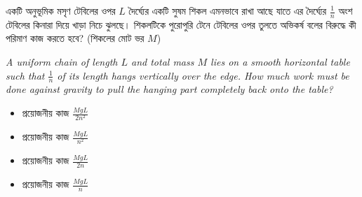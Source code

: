 \documentclass[12pt, a4paper]{article}
\begin{document}
\newpage

\begin{tcolorbox}[questionbox={প্রশ্ন (Question) 8}]
    \noindent
    একটি অনুভূমিক মসৃণ টেবিলের ওপর $L$ দৈর্ঘ্যের একটি সুষম শিকল এমনভাবে রাখা আছে যাতে এর দৈর্ঘ্যের $\frac{1}{n}$ অংশ টেবিলের কিনারা দিয়ে খাড়া নিচে ঝুলছে। শিকলটিকে পুরোপুরি টেনে টেবিলের ওপর তুলতে অভিকর্ষ বলের বিরুদ্ধে কী পরিমাণ কাজ করতে হবে? (শিকলের মোট ভর $M$)
    
    \vspace{0.8em}
    \begin{english}
    \noindent\textit{\color{darkgray}
    A uniform chain of length $L$ and total mass $M$ lies on a smooth horizontal table such that $\frac{1}{n}$ of its length hangs vertically over the edge. How much work must be done against gravity to pull the hanging part completely back onto the table?
    }
    \end{english}
\end{tcolorbox}

\vspace{1em}
\begin{center}
\end{center}
\vspace{1em}

\begin{itemize}[label={}, leftmargin=1cm, itemsep=0.5em]
    \item[\textbf{A)}] প্রয়োজনীয় কাজ $\frac{MgL}{2n^2}$
    \item[\textbf{B)}] প্রয়োজনীয় কাজ $\frac{MgL}{n^2}$
    \item[\textbf{C)}] প্রয়োজনীয় কাজ $\frac{MgL}{2n}$
    \item[\textbf{D)}] প্রয়োজনীয় কাজ $\frac{MgL}{n}$
\end{itemize}
\end{document}
